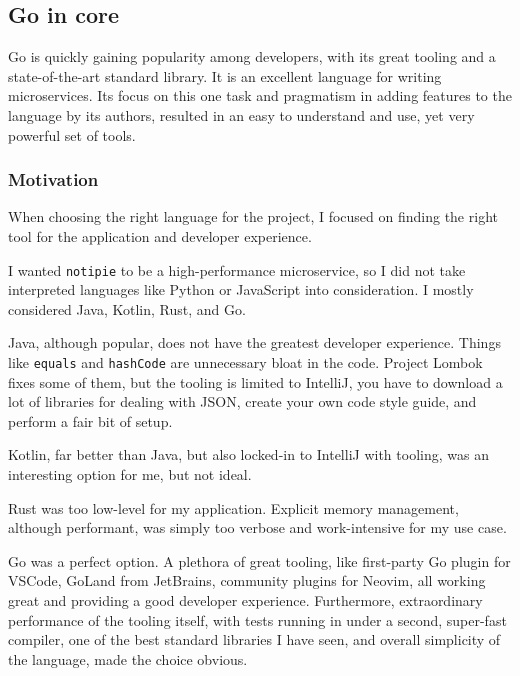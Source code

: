 \subsection{Go in core}\label{sec:go-in-core}

Go is quickly gaining popularity among developers,
with its great tooling
and a state-of-the-art standard library.
It is an excellent language for writing microservices.
Its focus on this one task
and pragmatism in adding features to the language by its authors,
resulted in an easy to understand and use,
yet very powerful set of tools.

\subsubsection{Motivation}\label{sec:motivation}

When choosing the right language for the project,
I focused on finding the right tool
for the application and developer experience.

I wanted \texttt{notipie} to be a high-performance microservice,
so I did not take interpreted languages
like Python or JavaScript into consideration.
I mostly considered Java, Kotlin, Rust, and Go.

Java, although popular, does not have the greatest developer experience.
Things like \texttt{equals} and \texttt{hashCode}
are unnecessary bloat in the code.
Project Lombok~\cite{zwitserloot_project_2022} fixes some of them,
but the tooling is limited to IntelliJ,
you have to download a lot of libraries for dealing with JSON,
create your own code style guide,
and perform a fair bit of setup.

Kotlin, far better than Java,
but also locked-in to IntelliJ with tooling,
was an interesting option for me, but not ideal.

Rust was too low-level for my application.
Explicit memory management, although performant,
was simply too verbose and work-intensive for my use case.

Go was a perfect option.
A plethora of great tooling,
like first-party Go plugin for VSCode, GoLand from JetBrains,
community plugins for Neovim,
all working great and providing a good developer experience.
Furthermore, extraordinary performance of the tooling itself,
with tests running in under a second, super-fast compiler,
one of the best standard libraries I have seen,
and overall simplicity of the language, made the choice obvious.
